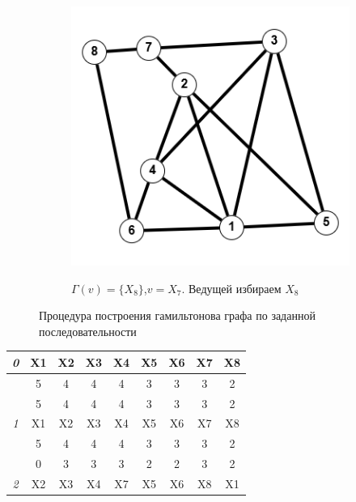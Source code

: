 \documentclass{article}
\begin{document}
\begin{enumerate}
\begin{figure}
\begin{subfigure}[b]{0.2\textwidth}
         \label{fig:3_6}
     \end{subfigure}
     \hfill
     \begin{subfigure}[b]{0.2\textwidth}
         \centering
         \caption*{\footnotesize{$\Gamma(v) = \{X_8\}$,$v = X_7$. Ведущей избираем $X_8$}}
         \includegraphics[width=\textwidth]{attachments/3/8.png}
         \label{fig:3_7}
     \end{subfigure}
        \caption{Процедура построения гамильтонова графа по заданной последовательности}
        \label{fig:3_gamilton}
\end{figure}
\begin{table}[!ht]
    \centering
    \begin{tabular}{|c|c|c|c|c|c|c|c|c|} \hline  
        \textit{0} & X1 & X2 & X3 & X4 & X5 & X6 & X7 &X8   \\ \hline 
        ~ & 5 & 4 & 4 & 4 & 3 & 3 & 3 &2 \\ \hline  
        ~ & 5& 4& 4& 4& 3& 3& 3 &2 \\ \hline 
        \textit{1} & \cellcolor{blue!25}X1 & X2 & X3 & X4 & X5 & X6 & X7 & X8 \\ \hline  
        & \cellcolor{blue!25}5 & 4 & 4 & 4 & 3 & 3 & 3 & 2 \\ \hline  
        & \cellcolor{blue!25}0 & 3 & 3 & 3 & 2 & 2 & 3 & 2 \\ \hline  
        \textit{2} & X2 & X3 & X4 & X7 & \cellcolor{blue!25}X5 & X6 & X8 & X1 \\ \hline  

\end{tabular}
\end{table}
\end{enumerate}
\end{document}

